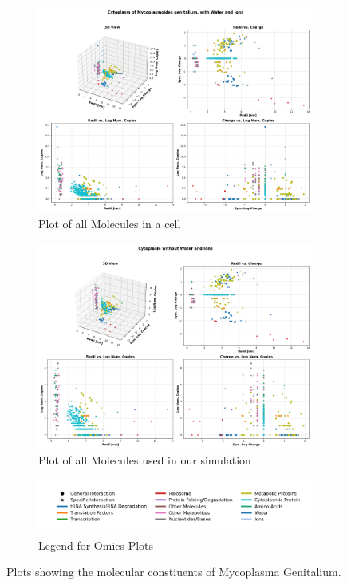 \documentclass[draft, english]{volcanica-template}
\begin{document}
\begin{figure}[!htbp]
\centering
\begin{figure}[!htbp]
\centering
\includegraphics[width=0.7\linewidth]{files/WithIons_plot-d8d62f26c724fea39a95d3648bbf66ba.png}
\caption[]{Plot of all Molecules in a cell}
\label{Fig1}
\end{figure}

\begin{figure}[!htbp]
\centering
\includegraphics[width=0.7\linewidth]{files/NoIons_plot-3fae4ccd74344a549bbdf23799b84aac.png}
\caption[]{Plot of all Molecules used in our simulation}
\label{Fig1_OmicsPlot-b}
\end{figure}

\begin{figure}[!htbp]
\centering
\includegraphics[width=0.7\linewidth]{files/WithIons_legend-437386609052150ba82cfce77a8ae812.png}
\caption[]{Legend for Omics Plots}
\label{Fig1_OmicsPlot-c}
\end{figure}
\caption[]{Plots showing the molecular constiuents of Mycoplasma Genitalium.}
\label{Fig1_OmicsPlot-c}
\end{figure}
\end{document}
